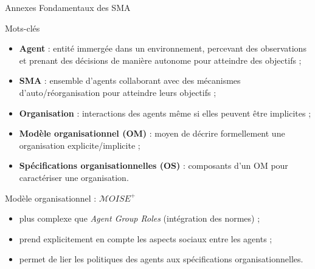 \begin{frame}[allowframebreaks]{Annexes} {Fondamentaux des SMA}

    \begin{block}{Mots-clés}
        \begin{itemize}
            \item \textbf{Agent} : entité immergée dans un environnement, percevant des observations et prenant des décisions de manière autonome pour atteindre des objectifs ;
            \item \textbf{SMA} : ensemble d'agents collaborant avec des mécanismes d'auto/réorganisation pour atteindre leurs objectifs ;
            \item \textbf{Organisation} : interactions des agents même si elles peuvent être implicites ;
            \item \textbf{Modèle organisationnel (OM)} : moyen de décrire formellement une organisation explicite/implicite ;
            \item \textbf{Spécifications organisationnelles (OS)} : composants d'un OM pour caractériser une organisation.
        \end{itemize}
    \end{block}
    
    \begin{block}{Modèle organisationnel : $\mathcal{M}OISE^+$}
        \begin{itemize}
            \item plus complexe que \emph{Agent Group Roles} (intégration des normes) ;
            \item prend explicitement en compte les aspects sociaux entre les agents ;
            \item permet de lier les politiques des agents aux spécifications organisationnelles.
        \end{itemize}
    \end{block}

\end{frame}

